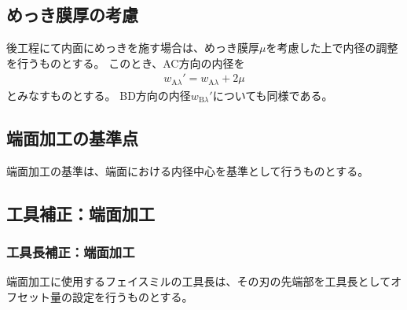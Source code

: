 \subsection{めっき膜厚の考慮}
後工程にて内面にめっきを施す場合は、めっき膜厚$\mu$を考慮した上で内径の調整を行うものとする。
このとき、AC方向の内径を
\begin{align*}
  w_{\mathrm A\lambda}' = w_{\mathrm A\lambda}+2\mu
\end{align*}
とみなすものとする。
BD方向の内径$w_{\mathrm B\lambda}'$についても同様である。



\clearpage


\subsection{端面加工の基準点}
端面加工の基準は、端面における内径中心を基準として行うものとする。


\subsection{工具補正：端面加工}

\subsubsection{工具長補正：端面加工}
端面加工に使用するフェイスミルの工具長は、その刃の先端部を工具長としてオフセット量の設定を行うものとする。

